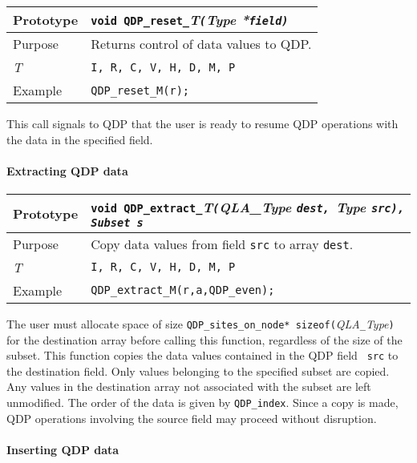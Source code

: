 \documentclass{article}
\newcommand{\allNumericTypes}{{\tt I, R, C, V, H, D, M, P}}
\newcommand{\ttdash}{{\tt \_}}
\newcommand{\itt}{\it T}
\newcommand{\extraarg}{, Subset s}
\begin{document}
\begin{flushleft}
\begin{tabular}{|l|l|}
  \hline
  Prototype      & {\tt void QDP}\ttdash{\tt reset}\ttdash\itt{\tt (}{\it Type *}{\tt field)}\\
\hline
Purpose        & Returns control of data values to QDP. \\
\hline
  \itt     & \allNumericTypes \\
\hline
Example  & \verb|QDP_reset_M(r);| \\
\hline
  \end{tabular}
\end{flushleft}
%
This call signals to QDP that the user is ready to resume QDP
operations with the data in the specified field.

\paragraph{Extracting QDP data}

\begin{flushleft}
\begin{tabular}{|l|l|}
  \hline
  Prototype      & {\tt void QDP}\ttdash{\tt extract}\ttdash\itt{\tt (}{\it QLA\_Type} {\tt *dest, }{\it Type }{\tt *src)\extraarg}\\
\hline
Purpose        & Copy data values from field {\tt src} to array {\tt dest}. \\
\hline
  \itt     & \allNumericTypes \\
\hline
Example  & \verb|QDP_extract_M(r,a,QDP_even);| \\
\hline
  \end{tabular}
\end{flushleft}
%
The user must allocate space of size \verb|QDP_sites_on_node*|{\tt
sizeof(}{\it QLA}\ttdash{\it Type}{\tt )} for the destination array
before calling this function, regardless of the size of the subset.
This function copies the data values contained in the QDP field {\tt
src} to the destination field.  Only values belonging to the specified
subset are copied.  Any values in the destination array not associated
with the subset are left unmodified.  The order of the data is given
by \verb|QDP_index|.  Since a copy is made, QDP operations
involving the source field may proceed without disruption.

\paragraph{Inserting QDP data}
\end{document}
